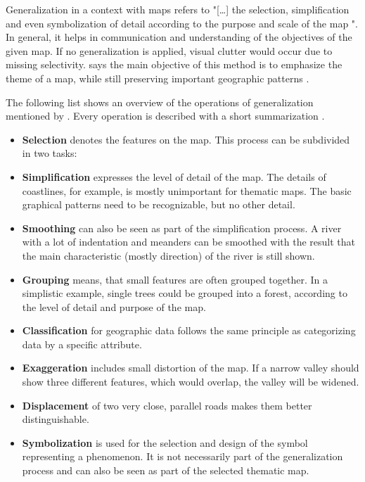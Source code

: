 Generalization in a context with maps refers to "[\ldots] the selection, simplification and even symbolization of detail according to the purpose and scale of the map ".
In general, it helps in communication and understanding of the objectives of the given map. If no generalization is applied, visual clutter would occur due to missing selectivity. \citeauthor{Tyner2010} says the main objective of this method is to emphasize the theme of a map, while still preserving important geographic patterns .

The following list shows an overview of the operations of generalization mentioned by \citeauthor{Tyner2010}. Every operation is described with a short summarization .

\begin{itemize}
\item \textbf{Selection} denotes the features on the map. This process can be subdivided in two tasks:


\item \textbf{Simplification} expresses the level of detail of the map. The details of coastlines, for example, is mostly unimportant for thematic maps. The basic graphical patterns need to be recognizable, but no other detail.

\item \textbf{Smoothing} can also be seen as part of the simplification process. A river with a lot of indentation and meanders can be smoothed with the result that the main characteristic (mostly direction) of the river is still shown.

\item \textbf{Grouping} means, that small features are often grouped together. In a simplistic example, single trees could be grouped into a forest, according to the level of detail and purpose of the map.

\item \textbf{Classification} for geographic data follows the same principle as categorizing data by a specific attribute.

\item \textbf{Exaggeration} includes small distortion of the map. If a narrow valley should show three different features, which would overlap, the valley will be widened.

\item \textbf{Displacement} of two very close, parallel roads makes them better distinguishable.

\item \textbf{Symbolization} is used for the selection and design of the symbol representing a phenomenon. It is not necessarily part of the generalization process and can also be seen as part of the selected thematic map.

\end{itemize}